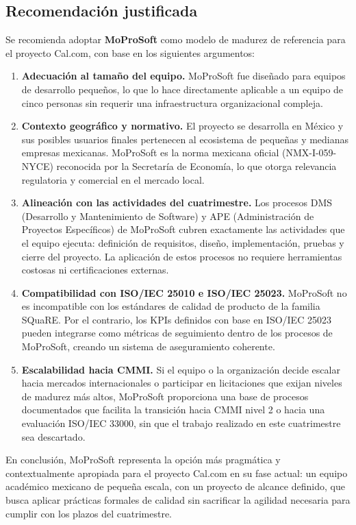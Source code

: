 \documentclass{article}
\begin{document}
\subsection{Recomendación justificada}

Se recomienda adoptar \textbf{MoProSoft} como modelo de madurez de referencia para el proyecto Cal.com, con base en los siguientes argumentos:

\begin{enumerate}
    \item \textbf{Adecuación al tamaño del equipo.} MoProSoft fue diseñado para equipos de desarrollo pequeños, lo que lo hace directamente aplicable a un equipo de cinco personas sin requerir una infraestructura organizacional compleja.

    \item \textbf{Contexto geográfico y normativo.} El proyecto se desarrolla en México y sus posibles usuarios finales pertenecen al ecosistema de pequeñas y medianas empresas mexicanas. MoProSoft es la norma mexicana oficial (NMX-I-059-NYCE) reconocida por la Secretaría de Economía, lo que otorga relevancia regulatoria y comercial en el mercado local.

    \item \textbf{Alineación con las actividades del cuatrimestre.} Los procesos DMS (Desarrollo y Mantenimiento de Software) y APE (Administración de Proyectos Específicos) de MoProSoft cubren exactamente las actividades que el equipo ejecuta: definición de requisitos, diseño, implementación, pruebas y cierre del proyecto. La aplicación de estos procesos no requiere herramientas costosas ni certificaciones externas.

    \item \textbf{Compatibilidad con ISO/IEC 25010 e ISO/IEC 25023.} MoProSoft no es incompatible con los estándares de calidad de producto de la familia SQuaRE. Por el contrario, los KPIs definidos con base en ISO/IEC 25023 \cite{iso25023_2016} pueden integrarse como métricas de seguimiento dentro de los procesos de MoProSoft, creando un sistema de aseguramiento coherente.

    \item \textbf{Escalabilidad hacia CMMI.} Si el equipo o la organización decide escalar hacia mercados internacionales o participar en licitaciones que exijan niveles de madurez más altos, MoProSoft proporciona una base de procesos documentados que facilita la transición hacia CMMI nivel 2 o hacia una evaluación ISO/IEC 33000, sin que el trabajo realizado en este cuatrimestre sea descartado.
\end{enumerate}

En conclusión, MoProSoft representa la opción más pragmática y contextualmente apropiada para el proyecto Cal.com en su fase actual: un equipo académico mexicano de pequeña escala, con un proyecto de alcance definido, que busca aplicar prácticas formales de calidad sin sacrificar la agilidad necesaria para cumplir con los plazos del cuatrimestre.

\newpage


\end{document}
